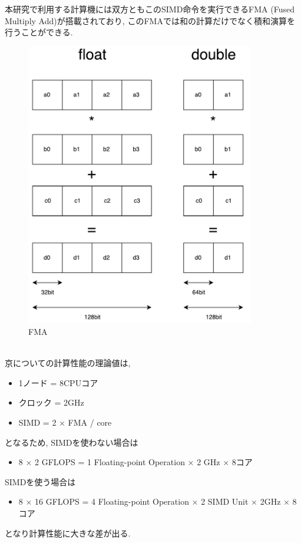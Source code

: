 本研究で利用する計算機には双方ともこのSIMD命令を実行できるFMA (Fused Multiply Add)が搭載されており,
このFMAでは和の計算だけでなく積和演算を行うことができる.\\
\begin{figure}[htb]
 \begin{center}
    \includegraphics[width=10cm]{./images/FMA.pdf}
    \caption{FMA}
    \label{fig:fma-image}
 \end{center}
\end{figure}~\\

京についての計算性能の理論値は,\\
\begin{itemize}
  \item 1ノード = 8CPUコア
  \item クロック = 2GHz
  \item SIMD = 2 × FMA / core
\end{itemize}
となるため, SIMDを使わない場合は\\
\begin{itemize}
  \item 8 × 2 GFLOPS = 1 Floating-point Operation × 2 GHz × 8コア
\end{itemize}
SIMDを使う場合は\\
\begin{itemize}
  \item 8 × 16 GFLOPS = 4 Floating-point Operation × 2 SIMD Unit × 2GHz × 8コア
\end{itemize}
となり計算性能に大きな差が出る.\\

